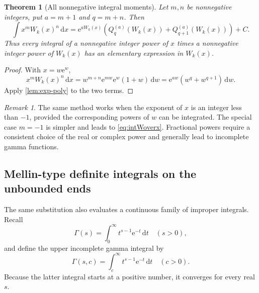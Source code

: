\documentclass[11pt]{article}
\newtheorem{theorem}{Theorem}[section]
\theoremstyle{remark}
\newtheorem{remark}[remark]{Remark}
\newcommand{\ee}{\mathrm e}
\newcommand{\dd}{\,\mathrm d}
\begin{document}
\begin{theorem}[All nonnegative integral moments]\label{thm:moments}
Let \(m,n\) be nonnegative integers, put \(a=m+1\) and \(q=m+n\).
Then
\begin{equation}\label{eq:momentformula}
 \int x^m W_k(x)^n\dd x
 =\ee^{aW_k(x)}
 \left(
  Q_q^{(a)}(W_k(x))
  +Q_{q+1}^{(a)}(W_k(x))
 \right)+C.
\end{equation}
Thus every integral of a nonnegative integer power of \(x\) times a
nonnegative integer power of \(W_k(x)\) has an elementary expression in
\(W_k(x)\).
\end{theorem}

\begin{proof}
With \(x=w\ee^w\),
\[
 x^mW_k(x)^n\dd x
 =w^{m+n}\ee^{mw}\ee^w(1+w)\dd w
 =\ee^{aw}(w^q+w^{q+1})\dd w.
\]
Apply \cref{lem:exp-poly} to the two terms.
\end{proof}

\begin{remark}
The same method works when the exponent of \(x\) is an integer less than
\(-1\), provided the corresponding powers of \(w\) can be integrated.
The special case \(m=-1\) is simpler and leads to
\eqref{eq:intWoverx}.  Fractional powers require a consistent choice of
the real or complex power and generally lead to incomplete gamma functions.
\end{remark}


\subsection{Mellin-type definite integrals on the unbounded ends}

The same substitution also evaluates a continuous family of improper
integrals.  Recall
\[
 \Gamma(s)=\int_0^\infty t^{s-1}\ee^{-t}\dd t
 \quad(s>0),
\]
and define the upper incomplete gamma integral by
\[
 \Gamma(s,c)=\int_c^\infty t^{s-1}\ee^{-t}\dd t
 \quad(c>0).
\]
Because the latter integral starts at a positive number, it converges for
every real \(s\).
\end{document}
